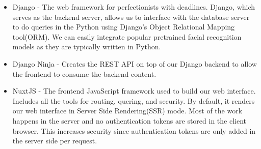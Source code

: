 \begin{itemize}
	\item	Django - The web framework for perfectionists with deadlines. Django, which serves as the backend server, allows us to interface with the database server to do queries in the Python using Django's Object Relational Mapping tool(ORM). We can easily integrate popular pretrained facial recognition models as they are typically written in Python.
\end{itemize}

\begin{itemize}
	\item	Django Ninja - Creates the REST API on top of our Django backend to allow the frontend to consume the backend content.
\end{itemize}

\begin{itemize}
	\item	NuxtJS - The frontend JavaScript framework used to build our web interface. Includes all the tools for routing, quering, and security. By default, it renders our web interface in Server Side Rendering(SSR) mode. Most of the work happens in the server and no authentication tokens are stored in the client browser. This increases security since authentication tokens are only added in the server side per request.
\end{itemize}
	
